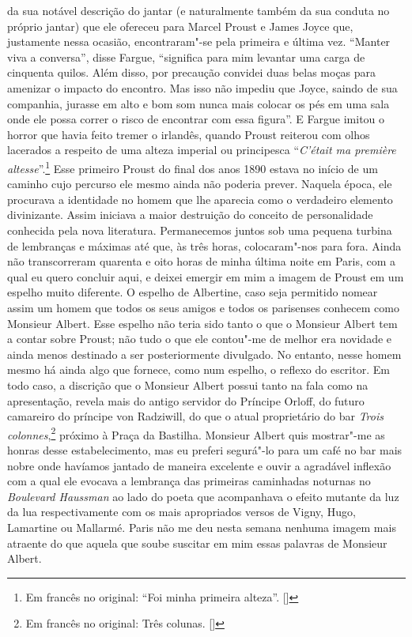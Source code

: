 da sua notável descrição do jantar (e naturalmente também da sua conduta
no próprio jantar) que ele ofereceu para Marcel Proust e James Joyce que,
justamente nessa ocasião, encontraram"-se pela primeira e última vez.
``Manter viva a conversa'', disse Fargue, ``significa para mim levantar
uma carga de cinquenta quilos. Além disso, por precaução convidei duas
belas moças para amenizar o impacto do encontro. Mas isso não impediu
que Joyce, saindo de sua companhia, jurasse em alto e bom som nunca mais
colocar os pés em uma sala onde ele possa correr o risco de encontrar
com essa figura''. E Fargue imitou o horror que havia feito tremer o
irlandês, quando Proust reiterou com olhos lacerados a respeito de uma
alteza imperial ou principesca ``\emph{C'était ma première altesse}''.\footnote{Em francês no original: ``Foi minha primeira alteza''. []} Esse primeiro Proust do final dos
anos 1890 estava no início de um caminho cujo percurso ele mesmo ainda
não poderia prever. Naquela época, ele procurava a identidade no homem que lhe
aparecia como o verdadeiro elemento divinizante. Assim iniciava
a maior destruição do conceito de personalidade conhecida pela nova
literatura. Permanecemos juntos sob uma pequena turbina de lembranças
e máximas até que, às três horas, colocaram"-nos para fora. Ainda não
transcorreram quarenta e oito horas de minha última noite em Paris, com
a qual eu quero concluir aqui, e deixei emergir em mim a imagem de Proust
em um espelho muito diferente. O espelho de Albertine, caso seja permitido nomear assim um homem que todos os seus amigos e todos os parisenses conhecem como Monsieur Albert.
Esse espelho não teria sido tanto o que o Monsieur Albert tem a contar
sobre Proust; não tudo o que ele contou"-me de melhor era novidade e
ainda menos destinado a ser posteriormente divulgado. No entanto, nesse
homem mesmo há ainda algo que fornece, como num espelho, o reflexo do
escritor. Em todo caso, a discrição que o Monsieur Albert possui tanto na fala
como na apresentação, revela mais do antigo servidor do Príncipe Orloff,
do futuro camareiro do príncipe von Radziwill, do que o atual
proprietário do bar \emph{Trois colonnes},\footnote{Em francês no original: Três colunas. []} próximo à Praça da Bastilha.
Monsieur Albert quis mostrar"-me as honras desse estabelecimento, mas eu
preferi segurá"-lo para um café no bar mais nobre onde havíamos jantado
de maneira excelente e ouvir a agradável inflexão com a qual ele evocava
a lembrança das primeiras caminhadas noturnas no \emph{Boulevard
Haussman} ao lado do poeta que acompanhava o efeito mutante da luz da
lua respectivamente com os mais apropriados versos de Vigny, Hugo,
Lamartine ou Mallarmé. Paris não me deu nesta semana nenhuma imagem mais
atraente do que aquela que soube suscitar em mim essas palavras de
Monsieur Albert.
